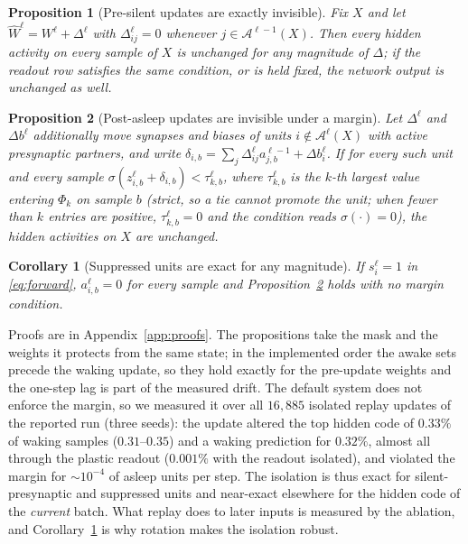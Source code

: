\documentclass{article}
\newtheorem{proposition}{Proposition}
\newtheorem{corollary}{Corollary}
\begin{document}
\begin{proposition}[Pre-silent updates are exactly invisible]\label{prop:pre}
Fix $X$ and let $\widehat W^\ell=W^\ell+\Delta^\ell$ with $\Delta^\ell_{ij}=0$ whenever
$j\in\mathcal{A}^{\ell-1}(X)$. Then every hidden activity on every sample of $X$ is
unchanged for any magnitude of $\Delta$; if the readout row satisfies the same condition, or
is held fixed, the network output is unchanged as well.
\end{proposition}
\begin{proposition}[Post-asleep updates are invisible under a margin]\label{prop:post}
Let $\Delta^\ell$ and $\Delta b^\ell$ additionally move synapses and biases of units
$i\notin\mathcal{A}^\ell(X)$ with active presynaptic partners, and write
$\delta_{i,b}=\sum_j\Delta^\ell_{ij}a^{\ell-1}_{j,b}+\Delta b^\ell_i$. If for every such unit
and every sample $\sigma(z^\ell_{i,b}+\delta_{i,b})<\tau^\ell_{k,b}$, where $\tau^\ell_{k,b}$
is the $k$-th largest value entering $\Phi_k$ on sample $b$ (strict, so a tie cannot promote
the unit; when fewer than $k$ entries are positive, $\tau^\ell_{k,b}=0$ and the condition
reads $\sigma(\cdot)=0$), the hidden activities on $X$ are unchanged.
\end{proposition}
\begin{corollary}[Suppressed units are exact for any magnitude]\label{cor:refr}
If $s^\ell_i=1$ in \eqref{eq:forward}, $a^\ell_{i,b}=0$ for every sample and
Proposition~\ref{prop:post} holds with no margin condition.
\end{corollary}
Proofs are in Appendix~\ref{app:proofs}. The propositions take the mask and the weights it
protects from the same state; in the implemented order the awake sets precede the waking
update, so they hold exactly for the pre-update weights and the one-step lag is part of the
measured drift. The default system does not enforce the margin, so we measured it over all
$16{,}885$ isolated replay updates of the reported run (three seeds): the update altered the
top hidden code of $0.33\%$ of waking samples ($0.31$--$0.35$) and a waking prediction for
$0.32\%$, almost all through the plastic readout ($0.001\%$ with the readout isolated), and
violated the margin for $\sim\!10^{-4}$ of asleep units per step. The isolation is thus exact
for silent-presynaptic and suppressed units and near-exact elsewhere for the hidden code of
the \emph{current} batch. What replay does to later inputs is measured by the ablation, and
Corollary~\ref{cor:refr} is why rotation makes the isolation robust.
\end{document}
